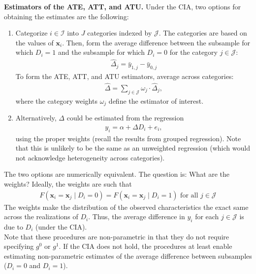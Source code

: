 \noindent \textbf{Estimators of the ATE, ATT, and ATU.} Under the CIA, two options for obtaining the estimates are the following: 
\begin{enumerate}
	\item Categorize $i \in \mathcal{I}$ into $J$ categories indexed by $\mathcal{J}$. The categories are based on the values of $\bm{x}_i$. Then, form the average difference between the subsample for which $D_i = 1$ and the subsample for which $D_i = 0$ for the category $j \in \mathcal{J}$: 
	\begin{align}
		\hat{\Delta}_j = \bar{y}_{1,j} - \bar{y}_{0,j}
	\end{align}
To form the ATE, ATT, and ATU estimators, average across categories: 
\begin{align}
	\hat{\Delta} = \sum \limits _{j \in \mathcal{J}} \omega_j \cdot \hat{\Delta}_j, 
\end{align}
\noindent where the category weights $\omega_j$ define the estimator of interest.
	\item Alternatively, $\Delta$ could be estimated from the regression 
\begin{align}
	y_i = \alpha + \Delta D_i + e_i, 
\end{align}
\noindent using the proper weights (recall the results from grouped regression). Note that this is unlikely to be the same as an unweighted regression (which would not acknowledge heterogeneity across categories). 
\end{enumerate}

\noindent The two options are numerically equivalent. The question is: What are the weights? Ideally, the weights are such that 
\begin{align}
	F \left( \bm{x}_i = \bm{x}_j \mid D_i = 0 \right) = F \left( \bm{x}_i = \bm{x}_j \mid D_i = 1 \right) \text{ for all } j \in \mathcal{J}
\end{align}
\noindent The weights make the distribution of the observed characteristics the exact same across the realizations of $D_i$. Thus, the average difference in $y_i$ for each $j \in \mathcal{J}$ is due to $D_i$ (under the CIA).\\

\noindent Note that these procedures are non-parametric in that they do not require specifying $g^0$ or $g^1$. If the CIA does not hold, the procedures at least enable estimating non-parametric estimates of the average difference between subsamples ($D_i = 0$ and $D_i = 1$).\\ 

